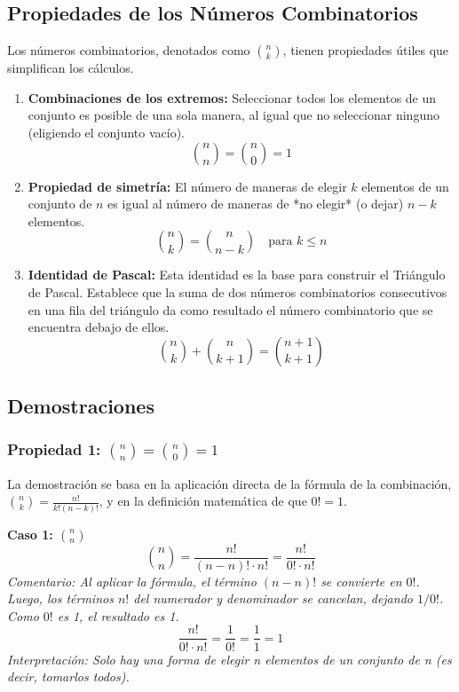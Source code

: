 \documentclass[12pt, letterpaper]{article}
\begin{document}
\subsection{Propiedades de los Números Combinatorios}
Los números combinatorios, denotados como $\binom{n}{k}$, tienen propiedades útiles que simplifican los cálculos.
\begin{enumerate}
	\item \textbf{Combinaciones de los extremos:} Seleccionar todos los elementos de un conjunto es posible de una sola manera, al igual que no seleccionar ninguno (eligiendo el conjunto vacío).
	      \[ \binom{n}{n} = \binom{n}{0} = 1 \]

	\item \textbf{Propiedad de simetría:} El número de maneras de elegir $k$ elementos de un conjunto de $n$ es igual al número de maneras de *no elegir* (o dejar) $n-k$ elementos.
	      \[ \binom{n}{k} = \binom{n}{n-k} \quad \text{para } k \leq n \]

	\item \textbf{Identidad de Pascal:} Esta identidad es la base para construir el Triángulo de Pascal. Establece que la suma de dos números combinatorios consecutivos en una fila del triángulo da como resultado el número combinatorio que se encuentra debajo de ellos.
	      \[ \binom{n}{k} + \binom{n}{k+1} = \binom{n+1}{k+1} \]
\end{enumerate}

\subsection{Demostraciones}
\subsubsection{\texorpdfstring{Propiedad 1: $\binom{n}{n} = \binom{n}{0} = 1$}{Propiedad 1: C(n,n) = C(n,0) = 1}}
La demostración se basa en la aplicación directa de la fórmula de la combinación, $\binom{n}{k} = \frac{n!}{k!(n-k)!}$, y en la definición matemática de que $0! = 1$.

\vspace{1em}
\noindent \textbf{Caso 1: $\binom{n}{n}$}
\[ \binom{n}{n} = \frac{n!}{(n-n)! \cdot n!} = \frac{n!}{0! \cdot n!} \]
\textit{Comentario: Al aplicar la fórmula, el término $(n-n)!$ se convierte en $0!$. Luego, los términos $n!$ del numerador y denominador se cancelan, dejando $1/0!$. Como $0!$ es 1, el resultado es 1.}
\[ \frac{n!}{0! \cdot n!} = \frac{1}{0!} = \frac{1}{1} = 1 \]
\textit{Interpretación: Solo hay una forma de elegir n elementos de un conjunto de n (es decir, tomarlos todos).}
\end{document}
